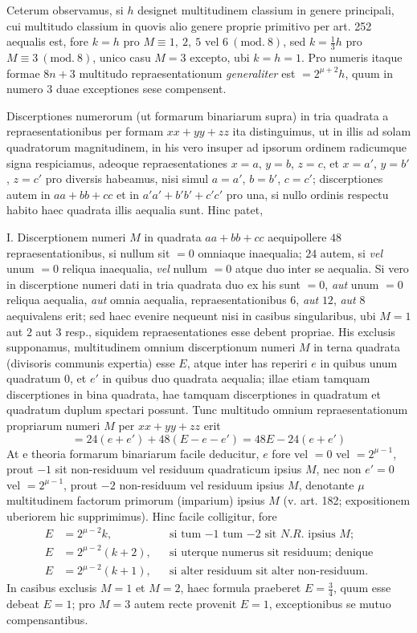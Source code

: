 Ceterum observamus, si $h$ designet multitudinem classium in genere principali, cui multitudo classium in quovis alio genere proprie primitivo per art. 252 aequalis est, fore $k=h$ pro $M\equiv1,\allowbreak \ 2,\allowbreak \ 5\text{ vel }6\ (\mathrm{mod.}\ 8)$, sed $k=\tfrac{1}{3}h$ pro $M\equiv3\ (\mathrm{mod.}\ 8)$, unico casu $M=3$ excepto, ubi $k=h=1$. Pro numeris itaque formae $8n+3$ multitudo repraesentationum \textit{generaliter} est $=2^{\mu+2}h$, quum in numero $3$ duae exceptiones sese compensent.

Discerptiones numerorum (ut formarum binariarum supra) in tria quadrata a repraesentationibus per formam $xx+yy+zz$ ita distinguimus, ut in illis ad solam quadratorum magnitudinem, in his vero insuper ad ipsorum ordinem radicumque signa respiciamus, adeoque repraesentationes $x=a$, $y=b$, $z=c$, et $x=a'$, $y=b'$, $z=c'$ pro diversis habeamus, nisi simul $a=a'$, $b=b'$, $c=c'$; discerptiones autem in $aa+bb+cc$ et in $a'a'+b'b'+c'c'$ pro una, si nullo ordinis respectu habito haec quadrata illis aequalia sunt. Hinc patet,

I. Discerptionem numeri $M$ in quadrata $aa+bb+cc$ aequipollere $48$ repraesentationibus, si nullum sit $=0$ omniaque inaequalia; $24$ autem, si \textit{vel} unum $=0$ reliqua inaequalia, \textit{vel} nullum $=0$ atque duo inter se aequalia. Si vero in discerptione numeri dati in tria quadrata duo ex his sunt $=0$, \textit{aut} unum $=0$ reliqua aequalia, \textit{aut} omnia aequalia, repraesentationibus $6$, \textit{aut} $12$, \textit{aut} $8$ aequivalens erit; sed haec evenire nequeunt nisi in casibus singularibus, ubi $M=1$ aut $2$ aut $3$ resp., siquidem repraesentationes esse debent propriae. His exclusis supponamus, multitudinem omnium discerptionum numeri $M$ in terna quadrata (divisoris communis expertia) esse $E$, atque inter has reperiri $e$ in quibus unum quadratum $0$, et $e'$ in quibus duo quadrata aequalia; illae etiam tamquam discerptiones in bina quadrata, hae tamquam discerptiones in quadratum et quadratum duplum spectari possunt. Tunc multitudo omnium repraesentationum propriarum numeri $M$ per $xx+yy+zz$ erit
\[
=24(e+e')+48(E-e-e')=48E-24(e+e')
\]
At e theoria formarum binariarum facile deducitur, $e$ fore vel $=0$ vel $=2^{\mu-1}$, prout $-1$ sit non-residuum vel residuum quadraticum ipsius $M$, nec non $e'=0$ vel $=2^{\mu-1}$, prout $-2$ non-residuum vel residuum ipsius $M$, denotante $\mu$ multitudinem factorum primorum (imparium) ipsius $M$ (v. art. 182; expositionem uberiorem hic supprimimus). Hinc facile colligitur, fore
\[
\begin{aligned}
E&=2^{\mu-2}k,&&\text{si tum $-1$ tum $-2$ sit $N.R.$ ipsius $M$;}\\
E&=2^{\mu-2}(k+2),&&\text{si uterque numerus sit residuum; denique}\\
E&=2^{\mu-2}(k+1),&&\text{si alter residuum sit alter non-residuum.}
\end{aligned}
\]
In casibus exclusis $M=1$ et $M=2$, haec formula praeberet $E=\tfrac{3}{4}$, quum esse debeat $E=1$; pro $M=3$ autem recte provenit $E=1$, exceptionibus se mutuo compensantibus.

